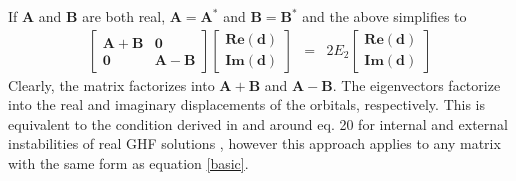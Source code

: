 \documentclass{revtex4}
\begin{document}
If $\mathbf{A}$ and $\mathbf{B}$ are both real, $\mathbf{A = A^*}$ and $\mathbf{B = B^*}$ and the 
above simplifies to 
\begin{eqnarray}
  \begin{bmatrix}
    \mathbf{A + B} & \mathbf{0} \\
    \mathbf{0} & \mathbf{A - B} 
  \end{bmatrix}
  \begin{bmatrix}
    \mathbf{Re(d)} \\
    \mathbf{Im(d)} 
  \end{bmatrix}
  &=& 2E_2   
  \begin{bmatrix}
    \mathbf{Re(d)} \\
    \mathbf{Im(d)} 
  \end{bmatrix}
\end{eqnarray}
Clearly, the matrix factorizes into $\mathbf{A+B}$ and $\mathbf{A-B}$. The eigenvectors factorize
into the real and imaginary displacements of the orbitals, respectively. This is equivalent to the 
condition derived in and around eq. 20 for internal and external instabilities of real
GHF solutions \cite{Seeger1977}, however this approach applies to any matrix with the same
form as equation \ref{basic}.
\end{document}
